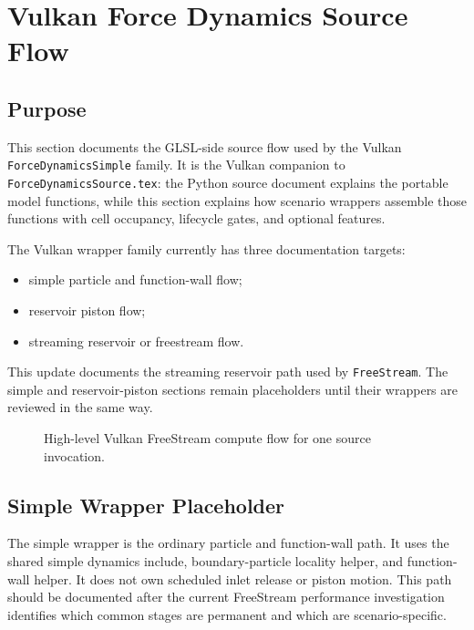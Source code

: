 \newpage
\section{Vulkan Force Dynamics Source Flow}

\subsection{Purpose}

This section documents the GLSL-side source flow used by the Vulkan
\texttt{ForceDynamicsSimple} family.  It is the Vulkan companion to
\texttt{ForceDynamicsSource.tex}: the Python source document explains the
portable model functions, while this section explains how scenario wrappers
assemble those functions with cell occupancy, lifecycle gates, and optional
features.

The Vulkan wrapper family currently has three documentation targets:
\begin{itemize}
    \item simple particle and function-wall flow;
    \item reservoir piston flow;
    \item streaming reservoir or freestream flow.
\end{itemize}

This update documents the streaming reservoir path used by
\texttt{FreeStream}.  The simple and reservoir-piston sections remain
placeholders until their wrappers are reviewed in the same way.

\begin{figure}[htbp]
\centering
\resizebox{0.98\textwidth}{!}{}
\caption{High-level Vulkan FreeStream compute flow for one source invocation.}
\label{fig:vulkan-force-dynamics-flow}
\end{figure}

\clearpage

\subsection{Simple Wrapper Placeholder}

The simple wrapper is the ordinary particle and function-wall path.  It uses
the shared simple dynamics include, boundary-particle locality helper, and
function-wall helper.  It does not own scheduled inlet release or piston
motion.  This path should be documented after the current FreeStream
performance investigation identifies which common stages are permanent and
which are scenario-specific.

